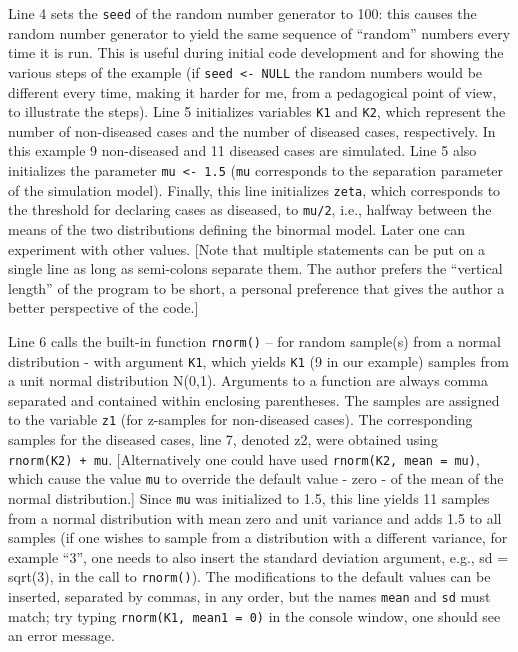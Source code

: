 \documentclass[
]{book}
\begin{document}
Line 4 sets the \texttt{seed} of the random number generator to 100: this causes the random number generator to yield the same sequence of ``random'' numbers every time it is run. This is useful during initial code development and for showing the various steps of the example (if \texttt{seed\ \textless{}-\ NULL} the random numbers would be different every time, making it harder for me, from a pedagogical point of view, to illustrate the steps). Line 5 initializes variables \texttt{K1} and \texttt{K2}, which represent the number of non-diseased cases and the number of diseased cases, respectively. In this example 9 non-diseased and 11 diseased cases are simulated. Line 5 also initializes the parameter \texttt{mu\ \textless{}-\ 1.5} (\texttt{mu} corresponds to the separation parameter of the simulation model). Finally, this line initializes \texttt{zeta}, which corresponds to the threshold for declaring cases as diseased, to \texttt{mu/2}, i.e., halfway between the means of the two distributions defining the binormal model. Later one can experiment with other values. {[}Note that multiple statements can be put on a single line as long as semi-colons separate them. The author prefers the ``vertical length'' of the program to be short, a personal preference that gives the author a better perspective of the code.{]}

Line 6 calls the built-in function \texttt{rnorm()} -- for random sample(s) from a normal distribution - with argument \texttt{K1}, which yields \texttt{K1} (9 in our example) samples from a unit normal distribution N(0,1). Arguments to a function are always comma separated and contained within enclosing parentheses. The samples are assigned to the variable \texttt{z1} (for z-samples for non-diseased cases). The corresponding samples for the diseased cases, line 7, denoted z2, were obtained using \texttt{rnorm(K2)\ +\ mu}. {[}Alternatively one could have used \texttt{rnorm(K2,\ mean\ =\ mu)}, which cause the value \texttt{mu} to override the default value - zero - of the mean of the normal distribution.{]} Since \texttt{mu} was initialized to 1.5, this line yields 11 samples from a normal distribution with mean zero and unit variance and adds 1.5 to all samples (if one wishes to sample from a distribution with a different variance, for example ``3'', one needs to also insert the standard deviation argument, e.g., sd = sqrt(3), in the call to \texttt{rnorm()}). The modifications to the default values can be inserted, separated by commas, in any order, but the names \texttt{mean} and \texttt{sd} must match; try typing \texttt{rnorm(K1,\ mean1\ =\ 0)} in the console window, one should see an error message.
\end{document}
